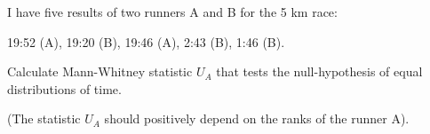 
\begin{question}
I have five results of two runners A and B for the 5 km race:

19:52 (A), 19:20 (B), 19:46 (A), 2:43 (B), 1:46 (B).

Calculate Mann-Whitney statistic \(U_A\) that tests the null-hypothesis of equal distributions of time.

(The statistic \(U_A\) should positively depend on the ranks of the runner A).
\end{question}


